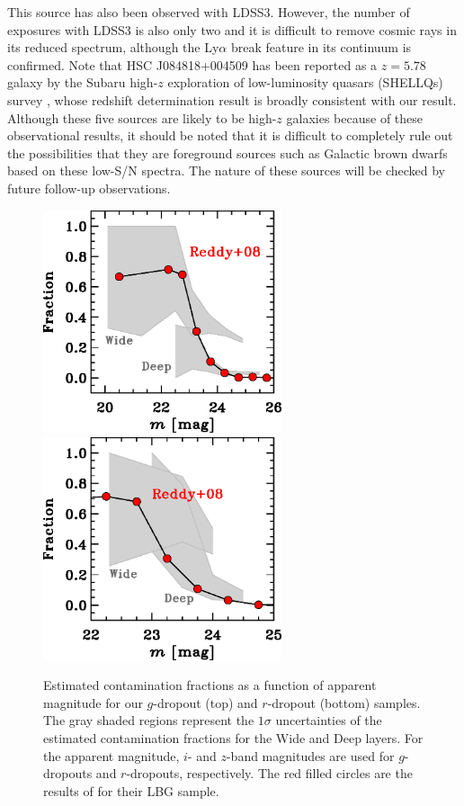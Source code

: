 \documentclass[]{pasj01}
\begin{document}
%
This source has also been observed with LDSS3.  
However, the number of exposures with LDSS3 is also only two 
and it is difficult to remove cosmic rays in its reduced spectrum, 
although the Ly$\alpha$ break feature in its continuum is confirmed. 
%
Note that HSC J084818+004509 has been reported as a $z=5.78$ galaxy 
by the Subaru high-$z$ exploration of low-luminosity quasars (SHELLQs) survey 
\citep{2016ApJ...828...26M}, 
whose redshift determination result is broadly consistent with our result. 
% 
Although these five sources are likely to be high-$z$ galaxies because of these observational results, 
it should be noted that 
it is difficult to completely rule out the possibilities that 
they are foreground sources such as Galactic brown dwarfs based on these low-S/N spectra. 
The nature of these sources will be checked by future follow-up observations. 



\begin{figure}
 \begin{center}
  \includegraphics[width=7cm]{contami_gdrop.eps} 
  \includegraphics[width=7cm]{contami_rdrop.eps} 
 \end{center}
\caption{
Estimated contamination fractions 
as a function of apparent magnitude 
for our $g$-dropout (top) and $r$-dropout (bottom) samples. 
The gray shaded regions represent  
the $1\sigma$ uncertainties of the estimated contamination fractions 
for the Wide and Deep layers. 
For the apparent magnitude, 
$i$- and $z$-band magnitudes are used 
for $g$-dropouts and $r$-dropouts, respectively. 
The red filled circles are the results of \citet{2008ApJS..175...48R} 
for their LBG sample. 
}\label{fig:contami_fraction}
\end{figure}
\end{document}
